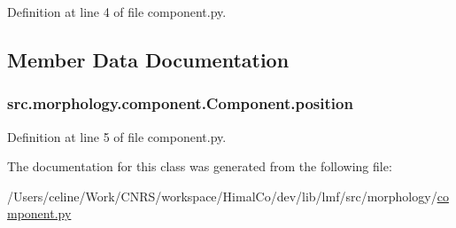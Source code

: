 Definition at line 4 of file component.\+py.



\subsection{Member Data Documentation}
\hypertarget{classsrc_1_1morphology_1_1component_1_1_component_ab5cb7e1497254923c3298a569001092f}{
\subsubsection[{position}]{\setlength{\rightskip}{0pt plus 5cm}src.\+morphology.\+component.\+Component.\+position}}\label{classsrc_1_1morphology_1_1component_1_1_component_ab5cb7e1497254923c3298a569001092f}


Definition at line 5 of file component.\+py.



The documentation for this class was generated from the following file\+:\begin{DoxyCompactItemize}
\item 
/\+Users/celine/\+Work/\+C\+N\+R\+S/workspace/\+Himal\+Co/dev/lib/lmf/src/morphology/\hyperlink{component_8py}{component.\+py}\end{DoxyCompactItemize}
